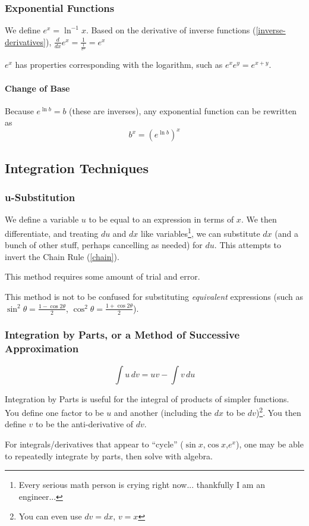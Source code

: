 \documentclass{article}
\begin{document}
\subsubsection{Exponential Functions}
We define $e^x=\ln^{-1}x$. Based on the derivative of inverse functions (\ref{inverse-derivatives}), $\frac{d}{dx}e^x=\frac{1}{\frac{1}{e^x}}=e^x$

$e^x$ has properties corresponding with the logarithm, such as $e^xe^y=e^{x+y}$.

\paragraph{Change of Base}
Because $e^{\ln{b}}=b$ (these are inverses), any exponential function can be rewritten as
$$b^x=\left(e^{\ln{b}}\right)^x$$

\subsection{Integration Techniques}
\subsubsection{u-Substitution}
We define a variable $u$ to be equal to an expression in terms of $x$. We then differentiate, and treating $du$ and $dx$ like variables\footnote{Every serious math person is crying right now... thankfully I am an engineer...}, we can substitute $dx$ (and a bunch of other stuff, perhaps cancelling as needed) for $du$.
This attempts to invert the Chain Rule (\ref{chain}).

This method requires some amount of trial and error.

This method is not to be confused for substituting \emph{equivalent} expressions (such as $\sin^2{\theta} = \frac{1-\cos{2\theta}}{2}$, $\cos^2{\theta} = \frac{1+\cos{2\theta}}{2}$).

\subsubsection{Integration by Parts, or a Method of Successive Approximation}
$$\int u\,dv=uv-\int v\,du$$

Integration by Parts is useful for the integral of products of simpler functions. You define one factor to be $u$ and another (including the $dx$ to be $dv$)\footnote{You can even use $dv=dx$, $v=x$}. You then define $v$ to be the anti-derivative of $dv$.

For integrals/derivatives that appear to ``cycle'' ($\sin{x}$,$\cos{x}$,$e^x$), one may be able to repeatedly integrate by parts, then solve with algebra.
\end{document}
